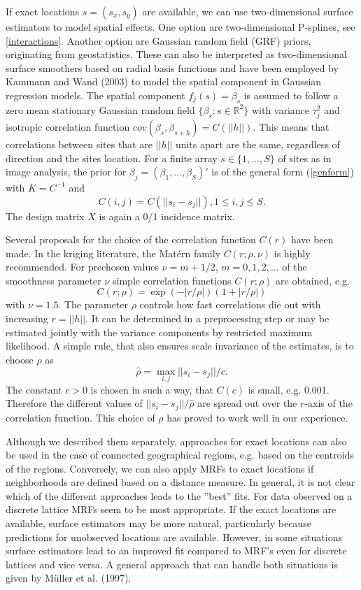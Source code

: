 \documentclass[11pt,a4paper,twoside]{bayesxarticle}
\begin{document}
If exact locations $s=(s_x,s_y)$ are available, we can use
two-dimensional surface estimators to model spatial effects. One
option are two-dimensional P-splines, see \autoref{interactions}.
Another option are Gaussian random field (GRF) priors, originating
from geostatistics. These can also be interpreted as two-dimensional
surface smoothers based on radial basis functions and have been
employed by Kammann and Wand (2003) to model the spatial component
in Gaussian regression models. The spatial component
$f_{j}(s)=\beta_s$ is assumed to follow a zero mean stationary
Gaussian random field $\{\beta_s:s\in\mathbb{R}^2\}$ with variance
$\tau_{j}^2$ and isotropic correlation function
$cov(\beta_s,\beta_{s+h})=C(||h||)$. This means that correlations
between sites that are $||h||$ units apart are the same, regardless
of direction and the sites location. For a finite array
$s\in\{1,\ldots,S\}$ of sites as in image analysis, the prior for
$\beta_j=(\beta_1,\ldots,\beta_S)'$ is of the general form
(\ref{genform}) with $K=C^{-1}$ and
\[C(i,j)=C(||s_i-s_j||), 1\le i,j\le S.\]
The design matrix $X$ is again a 0/1 incidence matrix.

Several proposals for the choice of the correlation function
$C(r)$ have been made. In the kriging literature, the Mat\'{e}rn
family $C(r;\rho,\nu)$ is highly recommended. For prechosen values $\nu=m+1/2$,
$m=0,1,2,\ldots$ of the smoothness parameter $\nu$ simple
correlation functions $C(r;\rho)$ are obtained, e.g.
\[C(r;\rho)=\exp(-|r/\rho|)(1+|r/\rho|)\]
with $\nu=1.5$. The parameter $\rho$ controls how fast correlations
die out with increasing $r=||h||$. It can be determined in a
preprocessing step or may be estimated jointly with the variance
components by restricted maximum likelihood. A simple rule, that
also ensures scale invariance of the estimates, is to choose $\rho$
as
\[\hat{\rho}=\max_{i,j}||s_i-s_j||/c.\]
The constant $c>0$ is chosen in such a way, that $C(c)$ is small,
e.g. 0.001. Therefore the different values of
$||s_i-s_j||/\hat{\rho}$ are spread out over the $r$-axis of the
correlation function. This choice of $\rho$ has proved to work well
in our experience.

Although we described them separately, approaches for exact
locations can also be used in the case of connected geographical
regions, e.g. based on the centroids of the regions. Conversely, we
can also apply MRFs to exact locations if neighborhoods are defined
based on a distance measure. In general, it is not clear which of
the different approaches leads to the ''best'' fits. For data
observed on a discrete lattice MRFs seem to be most appropriate. If
the exact locations are available, surface estimators may be more
natural, particularly because predictions for unobserved locations
are available. However, in some situations surface estimators lead
to an improved fit compared to MRF's even for discrete lattices and
vice versa. A general approach that can handle both situations is
given by M\"{u}ller et al. (1997).
\end{document}
